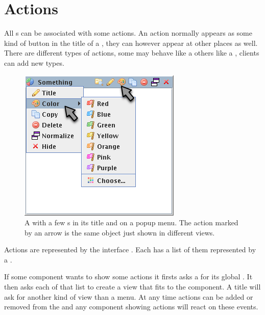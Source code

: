 \section{Actions} \label{sec:actions}
All s can be associated with some actions. An action normally appears as some kind of button in the title of a , they can however appear at other places as well. There are different types of actions, some may behave like a  others like a , clients can add new types.

\begin{figure}[h]
\centering
\includegraphics[scale=0.5]{actions/actions}
\caption{A  with a few s in its title and on a popup menu. The action marked by an arrow is the same object just shown in different views.}
\label{fig:actions}
\end{figure}

Actions are represented by the interface . Each  has a list of them represented by a .

If some component wants to show some actions it firsts asks a  for its global . It then asks each  of that list to create a view that fits to the component. A title will ask for another kind of view than a menu. At any time actions can be added or removed from the  and any component showing actions will react on these events.


